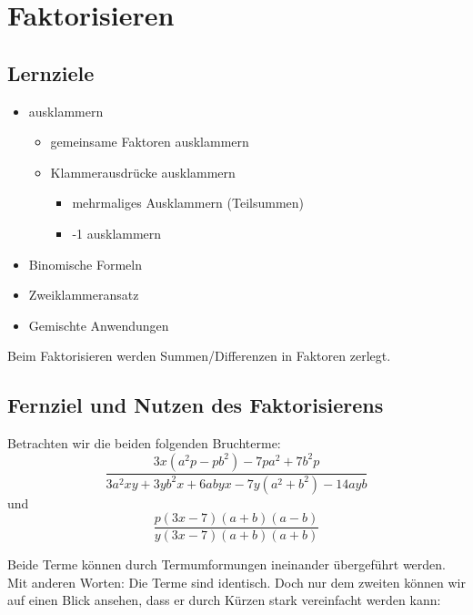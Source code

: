 \newpage
\section{Faktorisieren}


\subsection*{Lernziele}

\begin{itemize}
\item ausklammern
 \begin{itemize}
  \item gemeinsame Faktoren ausklammern
  \item Klammerausdrücke ausklammern
   \begin{itemize}
   \item mehrmaliges Ausklammern (Teilsummen)
  \item -1 ausklammern
  \end{itemize}
\end{itemize}
\item Binomische Formeln
\item Zweiklammeransatz
\item Gemischte Anwendungen
\end{itemize}
\newpage


Beim Faktorisieren werden Summen/Differenzen in Faktoren
zerlegt.


\subsection*{Fernziel und Nutzen des Faktorisierens}
Betrachten wir die beiden folgenden Bruchterme:
 $$\frac{3x(a^2p - pb^2) - 7pa^2 + 7b^2p}{3a^2xy  + 3yb^2x + 6abyx - 7y(a^2 +b^2) - 14ayb }$$
und
$$\frac{p(3x-7)(a+b)(a-b)}{y(3x-7)(a+b)(a+b)}$$

Beide Terme können durch Termumformungen ineinander übergeführt werden. Mit anderen Worten: Die Terme sind identisch. Doch nur dem zweiten können wir auf einen Blick ansehen, dass er durch Kürzen stark vereinfacht werden kann:

